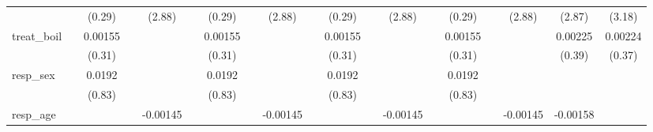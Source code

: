 {\begin{tabular}{l*{18}{c}}
            &                     &      (0.29)         &                     &      (2.88)         &                     &      (0.29)         &                     &      (2.88)         &                     &      (0.29)         &                     &      (2.88)         &                     &      (0.29)         &                     &      (2.88)         &      (2.87)         &      (3.18)         \\
[1em]
treat\_boil  &                     &     0.00155         &                     &                     &                     &     0.00155         &                     &                     &                     &     0.00155         &                     &                     &                     &     0.00155         &                     &                     &     0.00225         &     0.00224         \\
            &                     &      (0.31)         &                     &                     &                     &      (0.31)         &                     &                     &                     &      (0.31)         &                     &                     &                     &      (0.31)         &                     &                     &      (0.39)         &      (0.37)         \\
[1em]
resp\_sex    &                     &      0.0192         &                     &                     &                     &      0.0192         &                     &                     &                     &      0.0192         &                     &                     &                     &      0.0192         &                     &                     &                     &                     \\
            &                     &      (0.83)         &                     &                     &                     &      (0.83)         &                     &                     &                     &      (0.83)         &                     &                     &                     &      (0.83)         &                     &                     &                     &                     \\
[1em]
resp\_age    &                     &                     &                     &    -0.00145         &                     &                     &                     &    -0.00145         &                     &                     &                     &    -0.00145         &                     &                     &                     &    -0.00145         &    -0.00158         &                     \\

\end{tabular}}
